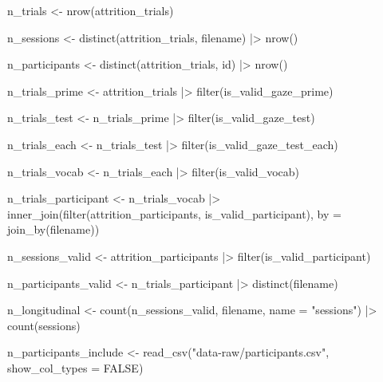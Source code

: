 \documentclass[
  letterpaper,
  DIV=11,
  numbers=noendperiod]{scrartcl}
\newenvironment{Shaded}{\begin{snugshade}}{\end{snugshade}}
\newcommand{\AttributeTok}[1]{\textcolor[rgb]{0.40,0.45,0.13}{#1}}
\newcommand{\ConstantTok}[1]{\textcolor[rgb]{0.56,0.35,0.01}{#1}}
\newcommand{\FunctionTok}[1]{\textcolor[rgb]{0.28,0.35,0.67}{#1}}
\newcommand{\NormalTok}[1]{\textcolor[rgb]{0.00,0.23,0.31}{#1}}
\newcommand{\OtherTok}[1]{\textcolor[rgb]{0.00,0.23,0.31}{#1}}
\newcommand{\SpecialCharTok}[1]{\textcolor[rgb]{0.37,0.37,0.37}{#1}}
\newcommand{\StringTok}[1]{\textcolor[rgb]{0.13,0.47,0.30}{#1}}
\begin{document}
\begin{Shaded}
\begin{Highlighting}[]
\NormalTok{n\_trials }\OtherTok{\textless{}{-}} \FunctionTok{nrow}\NormalTok{(attrition\_trials)}

\NormalTok{n\_sessions }\OtherTok{\textless{}{-}} \FunctionTok{distinct}\NormalTok{(attrition\_trials, filename) }\SpecialCharTok{|\textgreater{}} 
    \FunctionTok{nrow}\NormalTok{()}

\NormalTok{n\_participants }\OtherTok{\textless{}{-}} \FunctionTok{distinct}\NormalTok{(attrition\_trials, id) }\SpecialCharTok{|\textgreater{}} 
    \FunctionTok{nrow}\NormalTok{()}

\NormalTok{n\_trials\_prime }\OtherTok{\textless{}{-}}\NormalTok{ attrition\_trials }\SpecialCharTok{|\textgreater{}} 
    \FunctionTok{filter}\NormalTok{(is\_valid\_gaze\_prime)}

\NormalTok{n\_trials\_test }\OtherTok{\textless{}{-}}\NormalTok{ n\_trials\_prime }\SpecialCharTok{|\textgreater{}} 
    \FunctionTok{filter}\NormalTok{(is\_valid\_gaze\_test)}

\NormalTok{n\_trials\_each }\OtherTok{\textless{}{-}}\NormalTok{ n\_trials\_test }\SpecialCharTok{|\textgreater{}} 
    \FunctionTok{filter}\NormalTok{(is\_valid\_gaze\_test\_each)}

\NormalTok{n\_trials\_vocab }\OtherTok{\textless{}{-}}\NormalTok{ n\_trials\_each }\SpecialCharTok{|\textgreater{}} 
    \FunctionTok{filter}\NormalTok{(is\_valid\_vocab)}

\NormalTok{n\_trials\_participant }\OtherTok{\textless{}{-}}\NormalTok{ n\_trials\_vocab }\SpecialCharTok{|\textgreater{}} 
    \FunctionTok{inner\_join}\NormalTok{(}\FunctionTok{filter}\NormalTok{(attrition\_participants,}
\NormalTok{                      is\_valid\_participant),}
               \AttributeTok{by =} \FunctionTok{join\_by}\NormalTok{(filename))}

\NormalTok{n\_sessions\_valid }\OtherTok{\textless{}{-}}\NormalTok{ attrition\_participants }\SpecialCharTok{|\textgreater{}} 
    \FunctionTok{filter}\NormalTok{(is\_valid\_participant)}

\NormalTok{n\_participants\_valid }\OtherTok{\textless{}{-}}\NormalTok{ n\_trials\_participant }\SpecialCharTok{|\textgreater{}} 
    \FunctionTok{distinct}\NormalTok{(filename)}

\NormalTok{n\_longitudinal }\OtherTok{\textless{}{-}} \FunctionTok{count}\NormalTok{(n\_sessions\_valid, filename, }\AttributeTok{name =} \StringTok{"sessions"}\NormalTok{) }\SpecialCharTok{|\textgreater{}} 
    \FunctionTok{count}\NormalTok{(sessions)}

\NormalTok{n\_participants\_include }\OtherTok{\textless{}{-}} \FunctionTok{read\_csv}\NormalTok{(}\StringTok{"data{-}raw/participants.csv"}\NormalTok{,}
                                   \AttributeTok{show\_col\_types =} \ConstantTok{FALSE}\NormalTok{)}
\end{Highlighting}
\end{Shaded}
\end{document}

